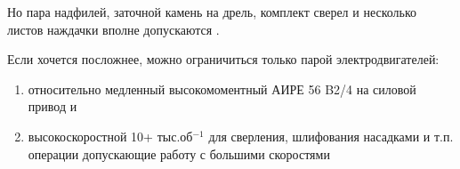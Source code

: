 \documentclass{magazine}
\begin{document}
\begin{multicols}{2}
Но пара надфилей, заточной камень на дрель, комплект сверел и несколько листов
наждачки вполне допускаются \smiley.

Если хочется посложнее, можно ограничиться только парой электродвигателей:
\begin{enumerate}
  \item 
относительно медленный высокомоментный АИРЕ 56 B2/4 на силовой привод и
\item 
высокоскоростной 10+ тыс.об$^{-1}$ для сверления, шлифования насадками и т.п.
операции допускающие работу с большими скоростями

\end{enumerate}


\end{multicols}


\end{document}
